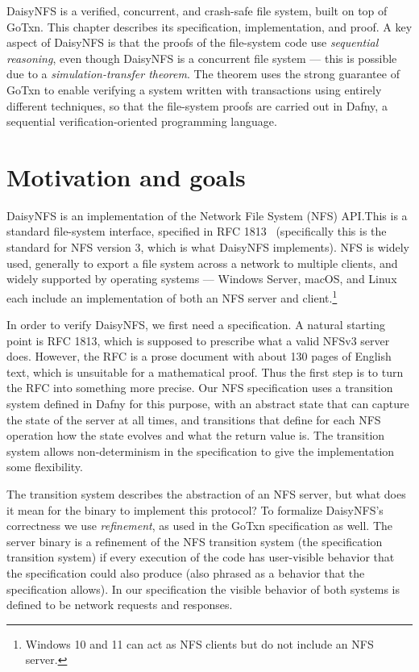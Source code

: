 DaisyNFS is a verified, concurrent, and crash-safe file system, built on top of
GoTxn. This chapter describes its specification, implementation, and proof. A
key aspect of DaisyNFS is that the proofs of the file-system code use \emph{sequential
reasoning}, even though DaisyNFS is a concurrent file system --- this is possible
due to a \emph{simulation-transfer theorem}. The theorem uses the strong
guarantee of GoTxn to enable verifying a system written with transactions using
entirely different techniques, so that the file-system proofs are carried out in
Dafny, a sequential verification-oriented programming language.

\section{Motivation and goals}%
\label{sec:daisy-nfs:motivation}

DaisyNFS is an implementation of the Network File System (NFS) API.\@ This is a
standard file-system interface, specified in RFC 1813~\cite{RFC:1813}
(specifically this is the standard for NFS version 3, which is what DaisyNFS
implements). NFS is widely used, generally to export a file system across a
network to multiple clients, and widely supported by operating systems ---
Windows Server, macOS, and Linux each include an implementation of both an NFS
server and client.\footnote{Windows 10 and 11 can act as NFS clients but do not
include an NFS server.}

In order to verify DaisyNFS, we first need a specification. A natural starting
point is RFC 1813, which is supposed to prescribe what a valid NFSv3 server
does. However, the RFC is a prose document with about 130 pages of English text,
which is unsuitable for a mathematical proof. Thus the first step is
to turn the RFC into something more precise. Our NFS specification uses a
transition system defined in Dafny for this purpose, with an abstract state that
can capture the state of the server at all times, and transitions that define
for each NFS operation how the state evolves and what the return value is. The
transition system allows non-determinism in the specification to give the
implementation some flexibility.

The transition system describes the abstraction of an NFS server, but what does
it mean for the  binary to implement this protocol? To formalize
DaisyNFS's correctness we use \emph{refinement}, as used in the GoTxn
specification as well. The server binary is a refinement of the NFS transition
system (the specification transition system) if every execution of the code has
user-visible behavior that the specification could also produce (also phrased as
a behavior that the specification allows). In our specification the visible
behavior of both systems is defined to be network requests and responses.

